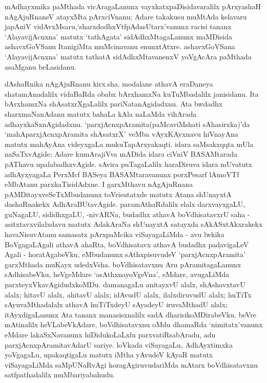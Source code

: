 mAdhayxmika paMthada vicAragaLanunx vayxkatxpaDisidavaralilx pArxyashaH nAgAjuRnaneV atayxMta pArxciVnanu; Adare takakusu muMtAda kelavaru japAniV vidAvxMsaru,\break `sharxdodhxVtfpAdasUtarx'vanunx racisi tananx `AlayavijAcnxna' matutx `tathAgata' sidAdhxMta\-gaLanunx maMDisida ashavxGoVSanu ItanigiMta muMcinavanu enunxtAtxre. ashavxGoVSana `AlayavijAcnxna' matutx tathatA sidAdhxMtavanenxV yoVgAcAra paMthada asaMganu beLasidanu.

dAshaRnika nAgAjuRnanu kirx.sha. modalane athavA eraDaneya shatamAnadalilx vidaBaRda obabx bArxhamxNa kuTuMbadalilx janisidanu. Ita bArxhamxNa shAsatxrXgaLalilx pariNatanAgidadxnu. Ata bwdadhx sharxmaNanAdanu matutx bahaLa kAla naLaMda vihArada adhayxkaSxnAgidadxnu. `parxjAcnxpAramita(paMcaviMshati sAhasirxka)'da `mahAparxjAcnxpAramita shAsatxrX' veMba vAyxKAyxnavu hiVnayAna matutx mahAyAna videyxgaLa mukuTapArxyakaqti. idara saMsakxqqta mUla naSaTxvAgide; Adare kumArajiVva mADida idara ciVniV BASAMtarada pAThavu upalabadhxvAgide. sAvira puTagaLalilx haraDiruva idara mUvatutx adhAyxyagaLa PerxMcf BASeya BASAMtaravanunx porxPesarf lAmoVTf eMbAtanu parxkaTisidAdxne. I garxMthavu nAgAjuRnana pAMDitayxveSeTxMbudanunx toVrisutatxde matutx Atana shUnayxtA dashaRnakekx AdhAraBUtavAgide. paramAthaRdalilx elalx darxvayxgaLU, guNagaLU, sididhxgaLU, -nivARNa, budadhx athavA boVdhisatavxrU saha - asitxtavxvilalxdavu matutx AdakAraNa shUnayxtA satayxda sAkASxtAkxrakekx havaNisuvAtanu samasatx pArxpaMcika viSayagaLiMda - avu lwkika BoVgagaLAgali athavA ahaRta, boVdhisatavx athavA budadhx padavigaLeV Agali - horatAgabeVku, eMbudanunx sAthxpisuvudeV `parxjAcnxpAramita' garxMthada muKayx udedxVsha. boVdhisatavxnu Aru pAramitagaLanunx sAdhisabeVku, heVgeMdare `asAthxnayoVgeVna', eMdare, avugaLiMda parxteyxVkavAgidudxkoMDu. damanagaLu anitayxvU alalx, shAshavxtavU alalx; hitavU alalx, ahitavU alalx; idAvudU alalx, ilalxdiruvudU alalx; huTiTx sAyuvaMthadalalx athavA huTiTxdeyU sAyadeyU iruvaMthadU alalx; itAyxdigaLanunx Ata tananx manasisxnalilx sadA dharisikoMDirabeVku. beVre mAtinalilx heVLabeVkAdare, boVdhisatavxnu oMdu dhamaRda `nimitatx'vanunx eMdare lakaSxNavanunx hiDidukoLaLxlu parxvatiRsabAradu, adu parxjAcnxpAramitavAdarU sariye. loVkada viSayagaLu, AdhAyxtimxka yoVgagaLu, upakaqtigaLu matutx iMtha yAvudeV kAyaR matutx viSayagaLiMda saMpUNaRvAgi horagAgiruvudariMda mAtarx boVdhisatavxnu satfpathadalilx muMbariyabahudu.

